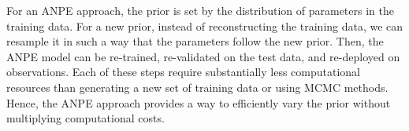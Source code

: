 For an ANPE approach, the prior is set by the distribution of parameters in the
training data. 
For a new prior, instead of reconstructing the training data, we can resample
it in such a way that the parameters follow the new prior.
Then, the ANPE model can be re-trained, re-validated on the test data, and
re-deployed on observations.
Each of these steps require substantially less computational resources than
generating a new set of training data or using MCMC methods. 
Hence, the ANPE approach provides a way to efficiently vary the prior without
multiplying computational costs.


